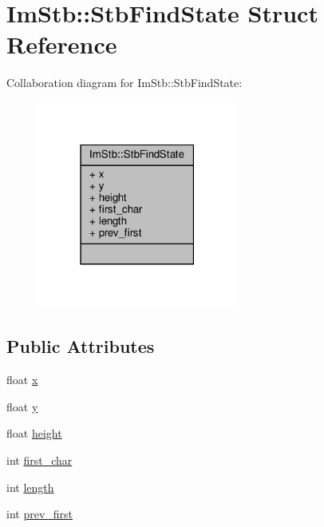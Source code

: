 \hypertarget{structImStb_1_1StbFindState}{}\section{Im\+Stb\+:\+:Stb\+Find\+State Struct Reference}
\label{structImStb_1_1StbFindState}


Collaboration diagram for Im\+Stb\+:\+:Stb\+Find\+State\+:
\nopagebreak
\begin{figure}[H]
\begin{center}
\leavevmode
\includegraphics[width=186pt]{structImStb_1_1StbFindState__coll__graph}
\end{center}
\end{figure}
\subsection*{Public Attributes}
\begin{DoxyCompactItemize}
\item 
float \hyperlink{structImStb_1_1StbFindState_a2233226b708f6673b179494a73cfca3d}{x}
\item 
float \hyperlink{structImStb_1_1StbFindState_a7e9bfd008e13aae14cd9cfc7cf9436d1}{y}
\item 
float \hyperlink{structImStb_1_1StbFindState_ac11400edb330bb6170922acf04649798}{height}
\item 
int \hyperlink{structImStb_1_1StbFindState_a247e22da771844f21e43be8c06dc8069}{first\+\_\+char}
\item 
int \hyperlink{structImStb_1_1StbFindState_ad5660b469b14d6c8b63bb70af2a4e9eb}{length}
\item 
int \hyperlink{structImStb_1_1StbFindState_afd38f31789989cf51f7b6bc358009d15}{prev\+\_\+first}
\end{DoxyCompactItemize}


